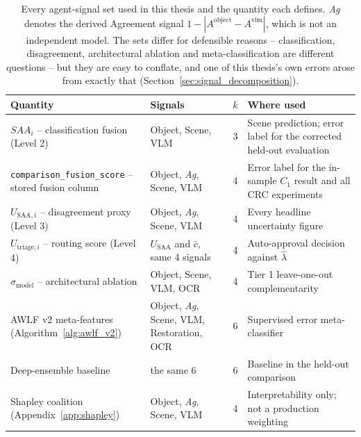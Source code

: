 \documentclass[12pt,a4paper]{report}
\begin{document}
\begin{table}[!htbp]
\centering
\caption[Every agent-signal set used in this thesis and the quantity each]{Every agent-signal set used in this thesis and the quantity each defines. \emph{Ag} denotes the derived Agreement signal $1-|A^{\text{object}}-A^{\text{vlm}}|$, which is not an independent model. The sets differ for defensible reasons -- classification, disagreement, architectural ablation and meta-classification are different questions -- but they are easy to conflate, and one of this thesis's own errors arose from exactly that (Section~\ref{sec:signal_decomposition}).}
\label{tab:signal_sets}
\small
\begin{tabular}{p{4.3cm}p{4.3cm}cp{3.3cm}}
\toprule
\textbf{Quantity} & \textbf{Signals} & \textbf{$k$} & \textbf{Where used} \\
\midrule
$SAA_i$ -- classification fusion (Level 2) & Object, Scene, VLM & 3 & Scene prediction; error label for the corrected held-out evaluation \\
\texttt{comparison\_fusion\_score} -- stored fusion column & Object, \emph{Ag}, Scene, VLM & 4 & Error label for the in-sample $C_1$ result and all CRC experiments \\
$U_{\text{SAA},i}$ -- disagreement proxy (Level 3) & Object, \emph{Ag}, Scene, VLM & 4 & Every headline uncertainty figure \\
$U_{\text{triage},i}$ -- routing score (Level 4) & $U_{\text{SAA}}$ and $\bar{c}$, same 4 signals & 4 & Auto-approval decision against $\hat\lambda$ \\
$\sigma_{\text{model}}$ -- architectural ablation & Object, Scene, VLM, OCR & 4 & Tier 1 leave-one-out complementarity \\
AWLF v2 meta-features (Algorithm~\ref{alg:awlf_v2}) & Object, \emph{Ag}, Scene, VLM, Restoration, OCR & 6 & Supervised error meta-classifier \\
Deep-ensemble baseline & the same 6 & 6 & Baseline in the held-out comparison \\
Shapley coalition (Appendix~\ref{app:shapley}) & Object, \emph{Ag}, Scene, VLM & 4 & Interpretability only; not a production weighting \\
\bottomrule
\end{tabular}
\end{table}
\end{document}
